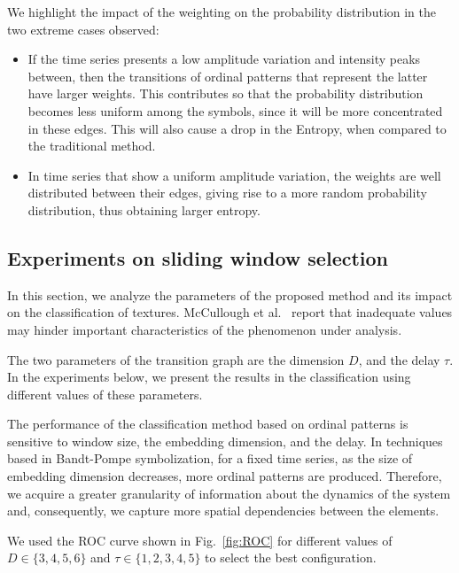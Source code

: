 \documentclass[journal]{IEEEtran}
\begin{document}
	We highlight the impact of the weighting on the probability distribution in the two extreme cases observed:
	\begin{itemize}
		\item If the time series presents a low amplitude variation and intensity peaks between, then the transitions of ordinal patterns that represent the latter have larger weights.
		This contributes so that the probability distribution becomes less uniform among the symbols, since it will be more concentrated in these edges.
		This will also cause a drop in the Entropy, when compared to the traditional method.
		\item In time series that show a uniform amplitude variation, the weights are well distributed between their edges, giving rise to a more random probability distribution, thus obtaining larger entropy.
	\end{itemize}
	
	\subsection{Experiments on sliding window selection}
	
	In this section, we analyze the parameters of the proposed method and its impact on the classification of textures.
	McCullough et al.~\cite{McCullough2015lagged} report that inadequate values may hinder important characteristics of the phenomenon under analysis.
	
	The two parameters of the transition graph are the dimension $D$, and the delay $\tau$.
	In the experiments below, we present the results in the classification using different values of these parameters.
	
	The performance of the classification method based on ordinal patterns is sensitive to window size, the embedding dimension, and the delay.
	In techniques based in Bandt-Pompe symbolization, for a fixed time series, as the size of embedding dimension decreases, more ordinal patterns are produced.
	Therefore, we acquire a greater granularity of information about the dynamics of the system and, consequently, we capture more spatial dependencies between the elements.
	
	We used the ROC curve shown in Fig.~\ref{fig:ROC} for different values of $D \in \{3, 4, 5, 6 \} $ and $\tau \in \{1, 2, 3, 4, 5 \}$ to select the best configuration.
	
\end{document}
